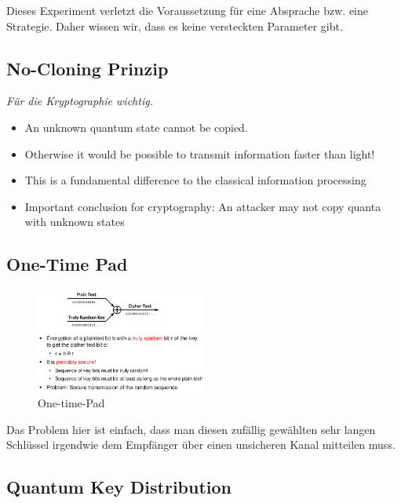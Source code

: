 Dieses Experiment verletzt die Voraussetzung für eine Absprache bzw.
eine Strategie. Daher wissen wir, dass es keine versteckten Parameter
gibt.

\hypertarget{no-cloning-prinzip}{%
\subsection{No-Cloning Prinzip}\label{no-cloning-prinzip}}

\emph{Für die Kryptographie wichtig.}

\begin{itemize}
\tightlist
\item
  An unknown quantum state cannot be copied.
\item
  Otherwise it would be possible to transmit information faster than
  light!
\item
  This is a fundamental difference to the classical information
  processing
\item
  Important conclusion for cryptography: An attacker may not copy quanta
  with unknown states
\end{itemize}

\hypertarget{one-time-pad}{%
\subsection{One-Time Pad}\label{one-time-pad}}

\begin{figure}[H]
\centering
\includegraphics[width=0.5\textwidth]{figures/oneTimePadQuantum.png}
\caption{One-time-Pad}
\end{figure}

Das Problem hier ist einfach, dass man diesen zufällig gewählten sehr
langen Schlüssel irgendwie dem Empfänger über einen unsicheren Kanal
mitteilen muss.

\hypertarget{quantum-key-distribution}{%
\subsection{Quantum Key Distribution}\label{quantum-key-distribution}}

